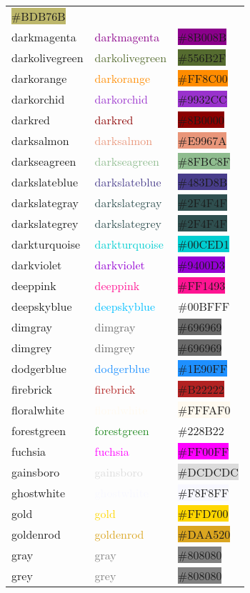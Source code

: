 \documentclass[
]{article}
\begin{document}
\begin{longtable}[]{@{}lll@{}}
\colorbox{darkkhaki}{\#BDB76B}\tabularnewline
darkmagenta & \textcolor{darkmagenta}{darkmagenta} &
\colorbox{darkmagenta}{\#8B008B}\tabularnewline
darkolivegreen & \textcolor{darkolivegreen}{darkolivegreen} &
\colorbox{darkolivegreen}{\#556B2F}\tabularnewline
darkorange & \textcolor{darkorange}{darkorange} &
\colorbox{darkorange}{\#FF8C00}\tabularnewline
darkorchid & \textcolor{darkorchid}{darkorchid} &
\colorbox{darkorchid}{\#9932CC}\tabularnewline
darkred & \textcolor{darkred}{darkred} &
\colorbox{darkred}{\#8B0000}\tabularnewline
darksalmon & \textcolor{darksalmon}{darksalmon} &
\colorbox{darksalmon}{\#E9967A}\tabularnewline
darkseagreen & \textcolor{darkseagreen}{darkseagreen} &
\colorbox{darkseagreen}{\#8FBC8F}\tabularnewline
darkslateblue & \textcolor{darkslateblue}{darkslateblue} &
\colorbox{darkslateblue}{\#483D8B}\tabularnewline
darkslategray & \textcolor{darkslategray}{darkslategray} &
\colorbox{darkslategray}{\#2F4F4F}\tabularnewline
darkslategrey & \textcolor{darkslategray}{darkslategrey} &
\colorbox{darkslategray}{\#2F4F4F}\tabularnewline
darkturquoise & \textcolor{darkturquoise}{darkturquoise} &
\colorbox{darkturquoise}{\#00CED1}\tabularnewline
darkviolet & \textcolor{darkviolet}{darkviolet} &
\colorbox{darkviolet}{\#9400D3}\tabularnewline
deeppink & \textcolor{deeppink}{deeppink} &
\colorbox{deeppink}{\#FF1493}\tabularnewline
deepskyblue & \textcolor{deepskyblue}{deepskyblue} &
\colorbox{capri}{\#00BFFF}\tabularnewline
dimgray & \textcolor{dimgray}{dimgray} &
\colorbox{dimgray}{\#696969}\tabularnewline
dimgrey & \textcolor{dimgray}{dimgrey} &
\colorbox{dimgray}{\#696969}\tabularnewline
dodgerblue & \textcolor{dodgerblue}{dodgerblue} &
\colorbox{dodgerblue}{\#1E90FF}\tabularnewline
firebrick & \textcolor{firebrick}{firebrick} &
\colorbox{firebrick}{\#B22222}\tabularnewline
floralwhite & \textcolor{floralwhite}{floralwhite} &
\colorbox{floralwhite}{\#FFFAF0}\tabularnewline
forestgreen & \textcolor{forestgreen}{forestgreen} &
\colorbox{indiagreen}{\#228B22}\tabularnewline
fuchsia & \textcolor{fuchsia}{fuchsia} &
\colorbox{fuchsia}{\#FF00FF}\tabularnewline
gainsboro & \textcolor{gainsboro}{gainsboro} &
\colorbox{gainsboro}{\#DCDCDC}\tabularnewline
ghostwhite & \textcolor{ghostwhite}{ghostwhite} &
\colorbox{ghostwhite}{\#F8F8FF}\tabularnewline
gold & \textcolor{gold}{gold} & \colorbox{gold}{\#FFD700}\tabularnewline
goldenrod & \textcolor{goldenrod}{goldenrod} &
\colorbox{goldenrod}{\#DAA520}\tabularnewline
gray & \textcolor{gray}{gray} & \colorbox{gray}{\#808080}\tabularnewline
grey & \textcolor{gray}{grey} & \colorbox{gray}{\#808080}\tabularnewline

\end{longtable}
\end{document}
